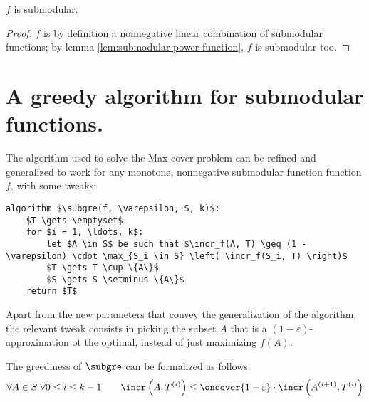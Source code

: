 \begin{claim}
    $f$ is submodular.
\end{claim}
\begin{proof}
    $f$ is by definition a nonnegative linear combination of submodular functions; by lemma \ref{lem:submodular-power-function}, $f$ is submodular too.
\end{proof}


\section{A greedy algorithm for submodular functions.} \label{sec:submodular-greedy}

The algorithm used to solve the Max cover problem can be refined and generalized to work for any monotone, nonnegative submodular function function $f$, with some tweaks:

\begin{lstlisting}[caption = {Greedy algorithm for submodular functions}, label = {lst:fS-greedysm}]
algorithm $\subgre(f, \varepsilon, S, k)$:
    $T \gets \emptyset$
    for $i = 1, \ldots, k$:
        let $A \in S$ be such that $\incr_f(A, T) \geq (1 - \varepsilon) \cdot \max_{S_i \in S} \left( \incr_f(S_i, T) \right)$
        $T \gets T \cup \{A\}$
        $S \gets S \setminus \{A\}$
    return $T$
\end{lstlisting}

Apart from the new parameters that convey the generalization of the algorithm, the relevant tweak consists in picking the subset $A$ that is a $(1 - \varepsilon)$-approximation ot the optimal, instead of just maximizing $f(A)$.

\begin{proposition}\label{prop:subgreediness}
    The greediness of $\subgre$ can be formalized as follows:
    \[
        \forall A \in S\; \forall 0 \leq i \leq k - 1 \qquad \incr \left( A, T^{(i)} \right) \leq \oneover{1 - \varepsilon} \cdot \incr \left( A^{(i + 1)}, T^{(i)} \right)
    \]
\end{proposition}

